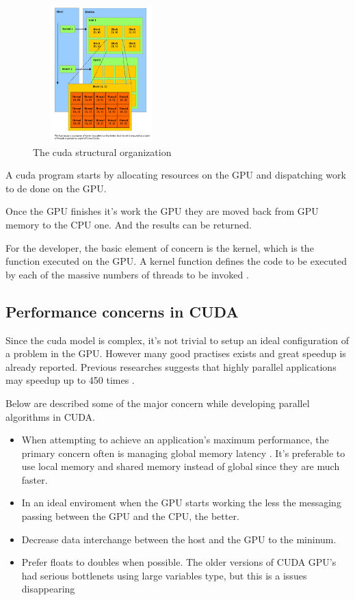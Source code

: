 \documentclass[conference]{IEEEtran}
\begin{document}
\begin{figure}
    \begin{center}
    \includegraphics[width=200px,height=200px]{cudaModel}
    \end{center}
    \caption{The cuda structural organization}
\end{figure}


A cuda program starts by allocating resources on the GPU and
dispatching work to de done on the GPU.

Once the GPU finishes it's work the GPU they are moved back from GPU
memory to the CPU one. And the results can be returned.

For the developer, the basic element of concern is the kernel, which is the function
executed on the GPU. A kernel function defines the code to be executed by each of the massive
numbers of threads to be invoked \cite{gpuOptimization}.

\subsection{Performance concerns in CUDA}
Since the cuda model is complex, it's not trivial to setup an ideal configuration 
of a problem in the GPU. However many good practises exists and great speedup is already 
reported.  Previous researches suggests that highly parallel
applications may speedup up to 450 times \cite{gpuOptimization}.

Below are described some of the major concern while developing parallel algorithms  in CUDA.

\begin{itemize}
    \item When attempting to achieve an application's maximum performance, the primary concern often is managing global memory latency \cite{gpuOptimization}. It's preferable to use local memory and shared memory instead of global since they are much faster.
    \item In an ideal enviroment when the GPU starts
        working the less the messaging passing between the GPU and the CPU, the better.
    \item Decrease data interchange between the host and the GPU to the mininum.
    \item Prefer floats to doubles when possible. The older versions of
    CUDA GPU's had serious bottlenets using large variables type, but
    this is a issues disappearing
\end{itemize}
\end{document}
